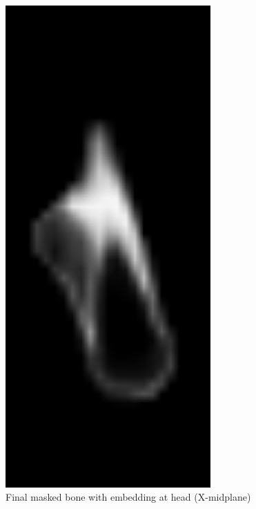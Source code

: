 \documentclass[a4paper,12pt]{article}
\begin{document}
    \begin{figure}[htbp]
        \centering
        \begin{minipage}[b]{0.3\textwidth}
            \includegraphics[width=0.7\textwidth]{bone_embedded-XM}
            \caption{Final masked bone with embedding at head (X-midplane)}
            \label{fig:bone_embedded-XM}
        \end{minipage}
        \hfill
        \begin{minipage}[b]{0.3\textwidth}

\end{minipage}
\end{figure}
\end{document}
